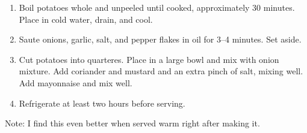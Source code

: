 
\begin{ingredients}
\end{ingredients}


\begin{recipe}
  \begin{enumerate}

  \item Boil potatoes whole and unpeeled until cooked, approximately
    30 minutes.  Place in cold water, drain, and cool.

  \item Saute onions, garlic, salt, and pepper flakes in oil for 3--4
    minutes.  Set aside.

  \item Cut potatoes into quarteres.  Place in a large bowl and mix
    with onion mixture.  Add coriander and mustard and an extra pinch
    of salt, mixing well.  Add mayonnaise and mix well.

  \item Refrigerate at least two hours before serving.

  \end{enumerate}
\end{recipe}

Note: I find this even better when served warm right after making it.
